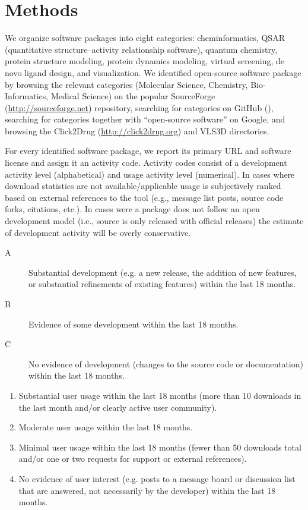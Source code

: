 \section{Methods}

We organize software packages into eight categories: cheminformatics, QSAR (quantitative structure–activity relationship software), quantum chemistry, protein structure modeling, protein dynamics modeling, virtual screening, de novo ligand design, and visualization.
We identified open-source software package by browsing the relevant categories (Molecular Science, Chemistry, Bio-Informatics, Medical Science) on the popular SourceForge (\url{http://sourceforge.net}) repository, searching for categories on GitHub (\href{http://github.com}), searching for categories together with ``open-source software'' on Google, and browsing the Click2Drug (\url{http://click2drug.org}) and VLS3D \cite{Villoutreix_2013} directories.

For every identified software package, we report its primary URL and software license and assign it an activity code. Activity codes consist of a development activity level (alphabetical) and usage activity level (numerical). In cases where download statistics are not available/applicable usage is subjectively ranked based on external references to the tool (e.g., message list posts, source code forks, citations, etc.).  In cases were a package does not follow an open development model (i.e., source is only released with official releases) the estimate of development activity will be overly conservative.

\begin{description}
  \item[A] Substantial development (e.g. a new release, the addition of new features, or substantial refinements of existing features) within the last 18 months.
  \item[B] Evidence of some development within the last 18 months.
  \item[C] No evidence of development (changes to the source code or documentation) within the last 18 months.
\end{description}
\begin{enumerate}
  \item Substantial user usage within the last 18 months (more than 10 downloads in the last month and/or clearly active user community).
  \item Moderate user usage within the last 18 months.
    \item Minimal user usage within the last 18 months (fewer than 50 downloads total and/or one or two requests for support or external references).
  \item No evidence of user interest (e.g. posts to a message board or discussion list that are answered, not necessarily by the developer) within the last 18 months.
\end{enumerate}

